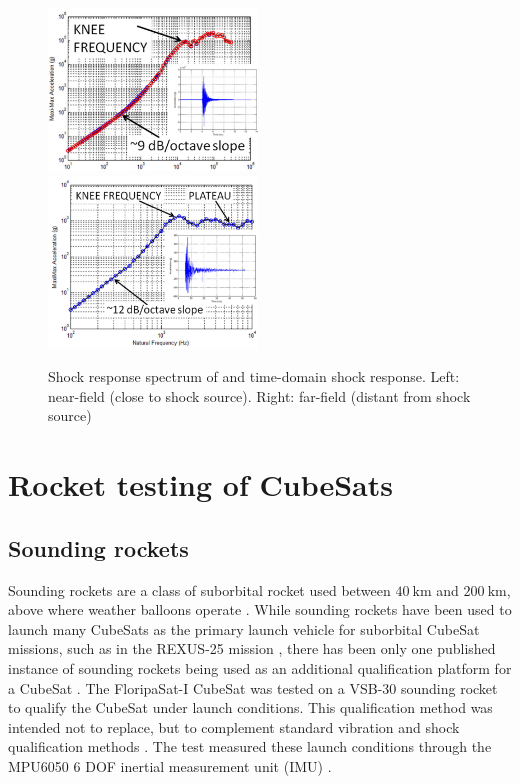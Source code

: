 \documentclass[draft]{report}
\begin{document}
\begin{figure}[H]
  \includegraphics[width=0.495\textwidth]{images/pyroshock2.png}
  \includegraphics[width=0.495\textwidth]{images/pyroshock1.png}
  \caption{Shock response spectrum of and time-domain shock response. Left: near-field (close to shock source). Right: far-field (distant from shock source) \cite{nasa-pyroshock}}
  \label{fig:pyroshock}
\end{figure}


\section{Rocket testing of CubeSats}
\subsection{Sounding rockets}
Sounding rockets are a class of suborbital rocket used between $\SI{40}{\kilo\metre}$ and $\SI{200}{\kilo\metre}$, above where weather balloons operate \cite{seibert2006history}. While sounding rockets have been used to launch many CubeSats as the primary launch vehicle for suborbital CubeSat missions, such as in the REXUS-25 mission \cite{pont2019rexus}, there has been only one published instance of sounding rockets being used as an additional qualification platform for a CubeSat \cite{slongo2019pre}. The FloripaSat-I CubeSat was tested on a VSB-30 sounding rocket \cite{slongo2019pre} to qualify the CubeSat under launch conditions. This qualification method was intended not to replace, but to complement standard vibration and shock qualification methods \cite{slongo2019pre}. The test measured these launch conditions through the MPU6050 6 DOF inertial measurement unit (IMU) \cite{slongo2019pre}.
\end{document}
